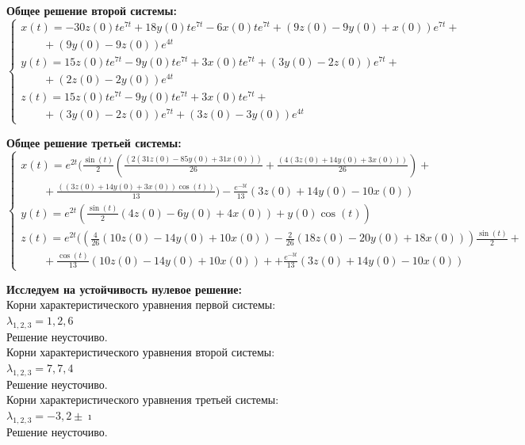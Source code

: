 \documentclass[a4paper, 12pt, oneside]{scrartcl}
\begin{document}
\begin{enumerate}
		\textbf{Общее решение второй системы: }
		\begin{equation*}
			\begin{cases}
			x(t)=-30z(0)te^{7t}+18y(0)te^{7t}-6x(0)te^{7t}+(9z(0)-9y(0)+ x(0))e^{7t} +
			\nonumber \\ \quad \quad +(9y(0)-9z(0))e^{4t}
			\\
			y(t)=15z(0)te^{7t}-9y(0)te^{7t}+3x(0)te^{7t}+(3y(0)-2z(0))e^{7t}+
			\nonumber \\ \quad \quad +(2z(0)-2y(0))e^{4t}
			\\
			z(t)=15z(0)te^{7t}-9y(0)te^{7t}+3x(0)te^{7t}+
			\nonumber \\ \quad \quad + (3y(0)-2z(0))e^{7t}+(3z(0)-3y(0))e^{4t}
			\end{cases}
		\end{equation*}		

		\textbf{Общее решение третьей системы: }
		\begin{equation*}
			\begin{cases}
			
			x(t)=e^{2t}(\frac{\sin(t)}{2}(\frac{(2(31z(0)-85y(0)+31x(0)))}{26}+\frac{(4(3z(0)+14y(0)+3x(0)))}{26}) +
			\nonumber\\ \quad \quad + \frac{((3z(0)+14y(0)+3x(0))\cos(t))}{13})- \frac{e^{-3t}}{13}(3z(0)+14y(0)-10x(0))

			\\
			y(t)=e^{2t}(\frac{\sin(t)}{2}(4z(0)-6y(0)+4x(0))+y(0)\cos(t))
			\\
			z(t)=e^{2t}((\frac{4}{26}(10z(0)-14y(0)+10x(0))-\frac{2}{26}(18z(0)-20y(0)+18x(0)))\frac{\sin(t)}{2} + 
			\nonumber\\ \quad \quad	+\frac{\cos(t)}{13}(10z(0)-14y(0)+10x(0))+ 
			+\frac{e^{-3t}}{13}(3z(0)+14y(0)-10x(0))
			

			\end{cases}
		\end{equation*}
		
		\textbf{Исследуем на устойчивость нулевое решение: } \\
		Корни характеристического уравнения первой системы:\\
		$\lambda_{1,2,3} = {1, 2, 6}$\\
		Решение неусточиво. \\ 
		Корни характеристического уравнения второй системы:\\
		$\lambda_{1,2,3} = {7, 7, 4}$\\
		Решение неусточиво. \\
		Корни характеристического уравнения третьей системы:\\
		$\lambda_{1,2,3} = {-3, 2\pm\imath}$\\
		Решение неусточиво. \\
		

\end{enumerate}
\end{document}
